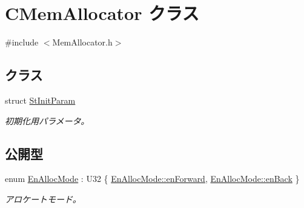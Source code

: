 \hypertarget{class_c_mem_allocator}{}\section{C\+Mem\+Allocator クラス}
\label{class_c_mem_allocator}


{\ttfamily \#include $<$Mem\+Allocator.\+h$>$}

\subsection*{クラス}
\begin{DoxyCompactItemize}
\item 
struct \hyperlink{struct_c_mem_allocator_1_1_st_init_param}{St\+Init\+Param}
\begin{DoxyCompactList}\small\item\em 初期化用パラメータ。 \end{DoxyCompactList}\end{DoxyCompactItemize}
\subsection*{公開型}
\begin{DoxyCompactItemize}
\item 
enum \hyperlink{class_c_mem_allocator_abf840ff9239492607ab3a3b8e0df2066}{En\+Alloc\+Mode} \+: U32 \{ \hyperlink{class_c_mem_allocator_abf840ff9239492607ab3a3b8e0df2066a51de7c871812c0d91929b2fa407db09f}{En\+Alloc\+Mode\+::en\+Forward}, 
\hyperlink{class_c_mem_allocator_abf840ff9239492607ab3a3b8e0df2066a3b7d737dc6a726f089f8d85df120a77f}{En\+Alloc\+Mode\+::en\+Back}
 \}\begin{DoxyCompactList}\small\item\em アロケートモード。 \end{DoxyCompactList}
\end{DoxyCompactItemize}
